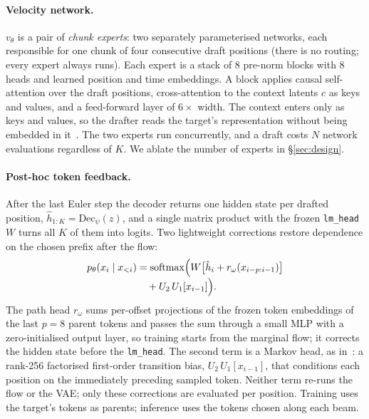 \documentclass{article}
\newcommand{\PathOrder}{8}                   %
\newcommand{\MarkovRank}{256}
\begin{document}
\paragraph{Velocity network.}
$v_\theta$ is a pair of \emph{chunk experts}: two separately parameterised
networks, each responsible for one chunk of four consecutive draft positions
(there is no routing; every expert always runs). Each expert is a stack of 8
pre-norm blocks with 8 heads and learned position and time embeddings. A block
applies causal self-attention over the draft positions, cross-attention to the
context latents $c$ as keys and values, and a feed-forward layer of $6\times$
width. The context enters only as keys and values, so the drafter reads the
target's representation without being embedded in it~\citep{samragh2025future}.
The two experts run concurrently, and a draft costs $N$ network evaluations
regardless of $K$. We ablate the number of experts in \S\ref{sec:design}.

\paragraph{Post-hoc token feedback.}
After the last Euler step the decoder returns one hidden state per drafted
position, $\hat h_{1:K}=\mathrm{Dec}_\psi(z)$, and a single matrix product
with the frozen \texttt{lm\_head} $W$ turns all $K$ of them into logits.
Two lightweight corrections restore dependence on the chosen prefix after
the flow:
\begin{equation}
\vcenter{%
\hbox{$\displaystyle p_\theta(x_i \mid x_{<i}) = \mathrm{softmax}\Big(W\big[\hat h_i + r_\omega(x_{i-p:i-1})\big]$}%
\hbox{$\displaystyle \qquad\qquad\qquad {}+ U_2\,U_1[x_{i-1}]\Big).$}}
\label{eq:feedback}
\end{equation}
The path head $r_\omega$ sums per-offset projections of the frozen token
embeddings of the last $p=\PathOrder$ parent tokens and passes the sum
through a small MLP with a zero-initialised output layer, so training starts
from the marginal flow; it corrects the hidden state before the
\texttt{lm\_head}. The second term is a Markov head, as
in~\citet{cheng2026dspark}: a rank-\MarkovRank{} factorised first-order
transition bias, $U_2\,U_1[x_{i-1}]$, that conditions each position on the
immediately preceding sampled token. Neither term re-runs the flow or the
VAE; only these corrections are evaluated per position. Training uses the
target's tokens as parents; inference uses the tokens chosen along each
beam.
\end{document}
